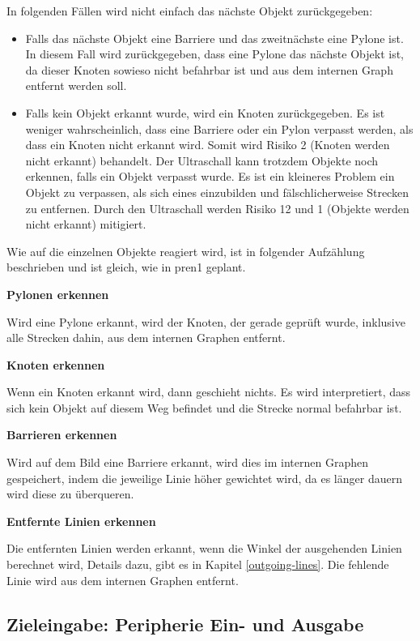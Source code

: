 In folgenden Fällen wird nicht einfach das nächste Objekt zurückgegeben:

\begin{itemize}
    \item Falls das nächste Objekt eine Barriere und das zweitnächste eine Pylone ist. In diesem Fall wird zurückgegeben, dass eine Pylone das nächste Objekt ist, da dieser Knoten sowieso nicht befahrbar ist und aus dem internen Graph entfernt werden soll.
    \item Falls kein Objekt erkannt wurde, wird ein Knoten zurückgegeben. Es ist weniger wahrscheinlich, dass eine Barriere oder ein Pylon verpasst werden, als dass ein Knoten nicht erkannt wird. Somit wird Risiko 2 (Knoten werden nicht erkannt) behandelt. Der Ultraschall kann trotzdem Objekte noch erkennen, falls ein Objekt verpasst wurde. Es ist ein kleineres Problem ein Objekt zu verpassen, als sich eines einzubilden und fälschlicherweise Strecken zu entfernen. Durch den Ultraschall werden Risiko 12 und 1 (Objekte werden nicht erkannt) mitigiert.
\end{itemize}


Wie auf die einzelnen Objekte reagiert wird, ist in folgender Aufzählung beschrieben und ist gleich, wie in \acrshort{pren1} geplant.

\textbf{Pylonen erkennen}

Wird eine Pylone erkannt, wird der Knoten, der gerade geprüft wurde, inklusive alle Strecken dahin, aus dem internen Graphen entfernt.

\textbf{Knoten erkennen}

Wenn ein Knoten erkannt wird, dann geschieht nichts. Es wird interpretiert, dass sich kein Objekt auf diesem Weg befindet und die Strecke normal befahrbar ist.

\textbf{Barrieren erkennen}

Wird auf dem Bild eine Barriere erkannt, wird dies im internen Graphen gespeichert, indem die jeweilige Linie höher gewichtet wird, da es länger dauern wird diese zu überqueren.

\textbf{Entfernte Linien erkennen}

Die entfernten Linien werden erkannt, wenn die Winkel der ausgehenden Linien berechnet wird, Details dazu, gibt es in Kapitel \ref{outgoing-lines}. Die fehlende Linie wird aus dem internen Graphen entfernt.

\newpage
\subsection{Zieleingabe: Peripherie Ein- und Ausgabe}

